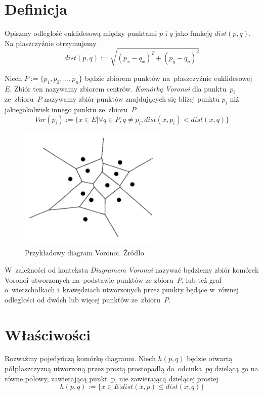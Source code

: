 \documentclass[skorowidz,autorrok,backref,xodstep,oswiadczenie]{wmimgr}
\begin{document}
\section{Definicja}

Opiszmy odległość euklidesową między punktami $p$ i $q$ jako funkcję $dist(p,q)$. Na płaszczyźnie otrzymujemy
\begin{equation}
dist(p,q) := \sqrt{( p_{x} - q_{x} )^2 + (p_{y} - q_{y})^2}
\end{equation}

Niech $P:=\{ p_{1},p_{2},...,p_{n} \}$ będzie zbiorem punktów na~płaszczyźnie euklidesowej $E$. Zbiór ten nazywamy zbiorem centrów. \emph{Komórką Voronoi} dla punktu~$p_{i}$ ze~zbioru~$P$ nazywamy zbiór punktów znajdujących się bliżej punktu $p_{i}$ niż jakiegokolwiek innego punktu ze~zbioru~$P$
\begin{equation}
Vor(p_{i}) := \{ x \in E | \forall q \in P, q \neq p_{i}, dist(x,p_{i}) < dist(x,q) \}
\end{equation}

\begin{figure}[ht!]
\centering
\includegraphics[width=70mm]{images/voronoi1.png}
\caption{Przykładowy diagram Voronoi. Źródło \cite{geometria}}
\label{voronoidiagram}
\end{figure}

W~zależności od kontekstu \emph{Diagramem Voronoi} nazywać będziemy zbiór komórek Voronoi utworzonych na~podstawie punktów ze zbioru~$P$, lub też graf o~wierzchołkach i~krawędziach utworzonych przez punkty będące w~równej odległości od dwóch lub więcej punktów ze~zbioru~$P$.

\section{Właściwości}

Rozważmy pojedyńczą komórkę diagramu. Niech $h(p,q)$ będzie otwartą półpłaszczyzną utworzoną przez prostą prostopadłą do~odcinka~$\overline{pq}$ dzielącą go na równe połowy, zawierającą punkt~p, nie zawierającą dzielącej prostej
\begin{equation}
h(p,q) := \{ x \in E | dist(x,p) \leq dist(x,q) \}
\end{equation}
\end{document}
